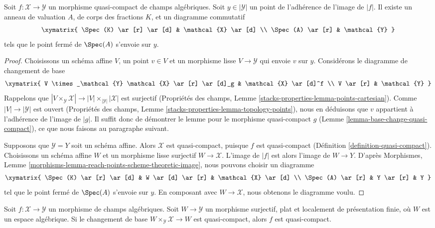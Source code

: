 \begin{lemma}
\label{lemma-reach-points-scheme-theoretic-image}
Soit $f : \mathcal{X} \to \mathcal{Y}$ un morphisme quasi-compact de
champs algébriques. Soit $y \in |\mathcal{Y}|$ un point de l'adhérence de
l'image de $|f|$. Il existe un anneau de valuation $A$, de corps des
fractions $K$, et un diagramme commutatif
$$
\xymatrix{
\Spec(K) \ar[r] \ar[d] & \mathcal{X} \ar[d] \\
\Spec(A) \ar[r] & \mathcal{Y}
}
$$
tels que le point fermé de $\Spec(A)$ s'envoie sur $y$.
\end{lemma}

\begin{proof}
Choisissons un schéma affine $V$, un point $v \in V$ et un morphisme lisse
$V \to \mathcal{Y}$ qui envoie $v$ sur $y$. Considérons le diagramme de
changement de base
$$
\xymatrix{
V \times_\mathcal{Y} \mathcal{X} \ar[r] \ar[d]_g & \mathcal{X} \ar[d]^f \\
V \ar[r] & \mathcal{Y}
}
$$
Rappelons que $|V \times_\mathcal{Y} \mathcal{X}| \to
|V| \times_{|\mathcal{Y}|} |\mathcal{X}|$ est surjectif
(Propriétés des champs, Lemme
\ref{stacks-properties-lemma-points-cartesian}). Comme
$|V| \to |\mathcal{Y}|$ est ouvert (Propriétés des champs, Lemme
\ref{stacks-properties-lemma-topology-points}), nous en déduisons que $v$
appartient à l'adhérence de l'image de $|g|$. Il suffit donc de démontrer le
lemme pour le morphisme quasi-compact $g$
(Lemme \ref{lemma-base-change-quasi-compact}), ce que nous faisons au
paragraphe suivant.

\medskip\noindent
Supposons que $\mathcal{Y} = Y$ soit un schéma affine. Alors $\mathcal{X}$
est quasi-compact, puisque $f$ est quasi-compact
(Définition \ref{definition-quasi-compact}). Choisissons un schéma affine
$W$ et un morphisme lisse surjectif $W \to \mathcal{X}$. L'image de $|f|$
est alors l'image de $W \to Y$. D'après Morphismes, Lemme
\ref{morphisms-lemma-reach-points-scheme-theoretic-image}, nous pouvons
choisir un diagramme
$$
\xymatrix{
\Spec(K) \ar[r] \ar[d] & W \ar[d] \ar[r] & \mathcal{X} \ar[d] \\
\Spec(A) \ar[r] & Y \ar[r] & Y
}
$$
tel que le point fermé de $\Spec(A)$ s'envoie sur $y$.
En composant avec $W \to \mathcal{X}$, nous obtenons le diagramme voulu.
\end{proof}

\begin{lemma}
\label{lemma-check-quasi-compact-covering}
Soit $f : \mathcal{X} \to \mathcal{Y}$ un morphisme de champs algébriques.
Soit $W \to \mathcal{Y}$ un morphisme surjectif, plat et localement de
présentation finie, où $W$ est un espace algébrique. Si le changement de base
$W \times_\mathcal{Y} \mathcal{X} \to W$ est quasi-compact, alors $f$ est
quasi-compact.
\end{lemma}

